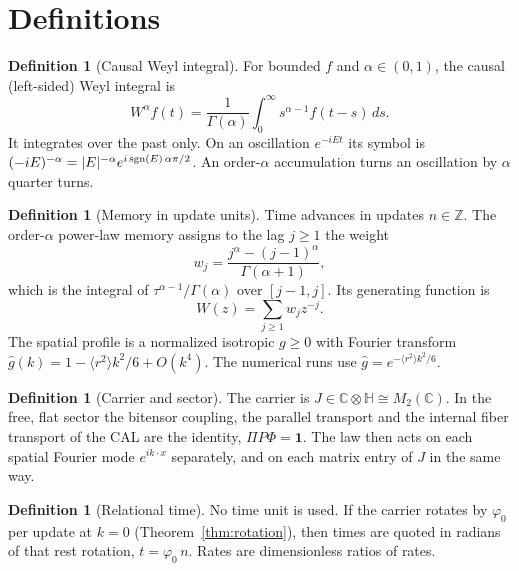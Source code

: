 \documentclass[11pt]{amsart}
\theoremstyle{definition}
\newtheorem{definition}[theorem]{Definition}
\theoremstyle{remark}
\newcommand{\one}{\mathbf 1}
\begin{document}
\section{Definitions}

\begin{definition}[Causal Weyl integral]\label{def:weyl}
For bounded $f$ and $\alpha\in(0,1)$, the causal (left-sided) Weyl integral is
\[
W^\alpha f(t)=\frac1{\Gamma(\alpha)}\int_0^\infty s^{\alpha-1}f(t-s)\,ds .
\]
It integrates over the past only. On an oscillation $e^{-iEt}$ its symbol is $(-iE)^{-\alpha}=\lvert E\rvert^{-\alpha}e^{i\,{\rm sgn}(E)\,\alpha\pi/2}$. An order-$\alpha$ accumulation turns an oscillation by $\alpha$ quarter turns.
\end{definition}

\begin{definition}[Memory in update units]\label{def:memory}
Time advances in updates $n\in\mathbb Z$. The order-$\alpha$ power-law memory assigns to the lag $j\ge1$ the weight
\[
w_j=\frac{j^\alpha-(j-1)^\alpha}{\Gamma(\alpha+1)},
\]
which is the integral of $\tau^{\alpha-1}/\Gamma(\alpha)$ over $[j-1,j]$. Its generating function is
\[
W(z)=\sum_{j\ge1}w_jz^{-j}.
\]
The spatial profile is a normalized isotropic $g\ge0$ with Fourier transform $\hat g(k)=1-\langle r^2\rangle k^2/6+O(k^4)$. The numerical runs use $\hat g=e^{-\langle r^2\rangle k^2/6}$.
\end{definition}

\begin{definition}[Carrier and sector]\label{def:sector}
The carrier is $J\in\mathbb C\otimes\mathbb H\cong M_2(\mathbb C)$. In the free, flat sector the bitensor coupling, the parallel transport and the internal fiber transport of the CAL are the identity, $\Pi P\Phi=\one$. The law then acts on each spatial Fourier mode $e^{ik\cdot x}$ separately, and on each matrix entry of $J$ in the same way.
\end{definition}

\begin{definition}[Relational time]\label{def:time}
No time unit is used. If the carrier rotates by $\varphi_0$ per update at $k=0$ (Theorem~\ref{thm:rotation}), then times are quoted in radians of that rest rotation, $t=\varphi_0\,n$. Rates are dimensionless ratios of rates.
\end{definition}

\end{document}
